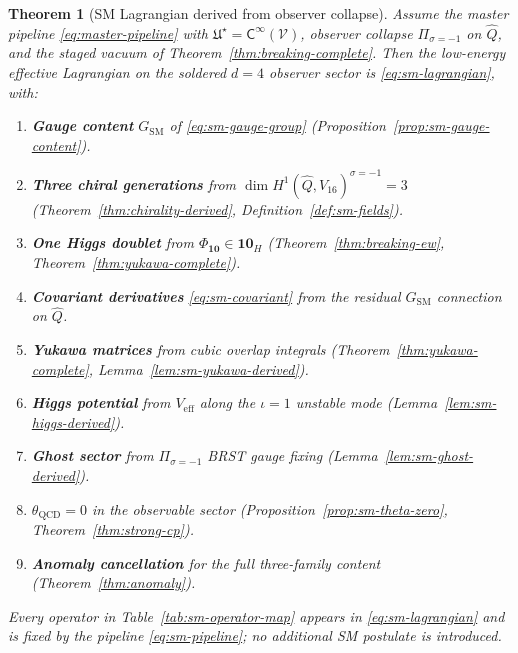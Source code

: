 \documentclass[aps,prd,onecolumn,amsmath,amssymb,nofootinbib,11pt]{revtex4-2}
\numberwithin{equation}{section}
\theoremstyle{plain}
\newtheorem{theorem}{Theorem}[section]
\theoremstyle{definition}
\theoremstyle{remark}
\newcommand{\Void}{\mathcal{V}}
\newcommand{\Climb}{\mathsf{C}}
\begin{document}
\begin{theorem}[SM Lagrangian derived from observer collapse]
\label{thm:sm-lagrangian-derived}
Assume the master pipeline \eqref{eq:master-pipeline} with
$\mathfrak{U}^\star=\Climb^\infty(\Void)$, observer collapse
$\Pi_{\sigma=-1}$ on $\hat Q$, and the staged vacuum of
Theorem~\ref{thm:breaking-complete}. Then the low-energy effective Lagrangian
on the soldered $d=4$ observer sector is \eqref{eq:sm-lagrangian}, with:
\begin{enumerate}[label=\textbf{(\roman*)},leftmargin=*]
  \item \textbf{Gauge content} $G_{\mathrm{SM}}$ of
    \eqref{eq:sm-gauge-group} (Proposition~\ref{prop:sm-gauge-content}).
  \item \textbf{Three chiral generations} from
    $\dim H^1(\hat Q,V_{16})^{\sigma=-1}=3$
    (Theorem~\ref{thm:chirality-derived}, Definition~\ref{def:sm-fields}).
  \item \textbf{One Higgs doublet} from $\Phi_{\mathbf{10}}\in\mathbf{10}_H$
    (Theorem~\ref{thm:breaking-ew}, Theorem~\ref{thm:yukawa-complete}).
  \item \textbf{Covariant derivatives} \eqref{eq:sm-covariant} from the
    residual $G_{\mathrm{SM}}$ connection on $\hat Q$.
  \item \textbf{Yukawa matrices} from cubic overlap integrals
    (Theorem~\ref{thm:yukawa-complete}, Lemma~\ref{lem:sm-yukawa-derived}).
  \item \textbf{Higgs potential} from $V_{\mathrm{eff}}$ along the
    $\iota=1$ unstable mode (Lemma~\ref{lem:sm-higgs-derived}).
  \item \textbf{Ghost sector} from $\Pi_{\sigma=-1}$ BRST gauge fixing
    (Lemma~\ref{lem:sm-ghost-derived}).
  \item \textbf{$\theta_{\mathrm{QCD}}=0$} in the observable sector
    (Proposition~\ref{prop:sm-theta-zero}, Theorem~\ref{thm:strong-cp}).
  \item \textbf{Anomaly cancellation} for the full three-family content
    (Theorem~\ref{thm:anomaly}).
\end{enumerate}
Every operator in Table~\ref{tab:sm-operator-map} appears in
\eqref{eq:sm-lagrangian} and is fixed by the pipeline
\eqref{eq:sm-pipeline}; no additional SM postulate is introduced.
\end{theorem}
\end{document}

